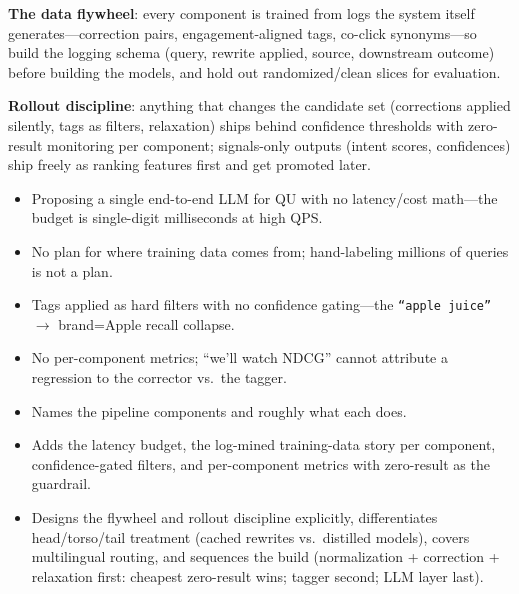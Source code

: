 \begin{interviewq}
\textbf{The data flywheel}: every component is trained from logs the system itself generates---correction pairs, engagement-aligned tags, co-click synonyms---so build the logging schema (query, rewrite applied, source, downstream outcome) before building the models, and hold out randomized/clean slices for evaluation.

\textbf{Rollout discipline}: anything that changes the candidate set (corrections applied silently, tags as filters, relaxation) ships behind confidence thresholds with zero-result monitoring per component; signals-only outputs (intent scores, confidences) ship freely as ranking features first and get promoted later.

\redflags
\begin{itemize}
    \item Proposing a single end-to-end LLM for QU with no latency/cost math---the budget is single-digit milliseconds at high QPS.
    \item No plan for where training data comes from; hand-labeling millions of queries is not a plan.
    \item Tags applied as hard filters with no confidence gating---the \texttt{``apple juice''} $\to$ brand=Apple recall collapse.
    \item No per-component metrics; ``we'll watch NDCG'' cannot attribute a regression to the corrector vs.\ the tagger.
\end{itemize}


\goodgreat
\begin{itemize}
    \item {} Names the pipeline components and roughly what each does.
    \item {} Adds the latency budget, the log-mined training-data story per component, confidence-gated filters, and per-component metrics with zero-result as the guardrail.
    \item {} Designs the flywheel and rollout discipline explicitly, differentiates head/torso/tail treatment (cached rewrites vs.\ distilled models), covers multilingual routing, and sequences the build (normalization + correction + relaxation first: cheapest zero-result wins; tagger second; LLM layer last).
\end{itemize}

\end{interviewq}

